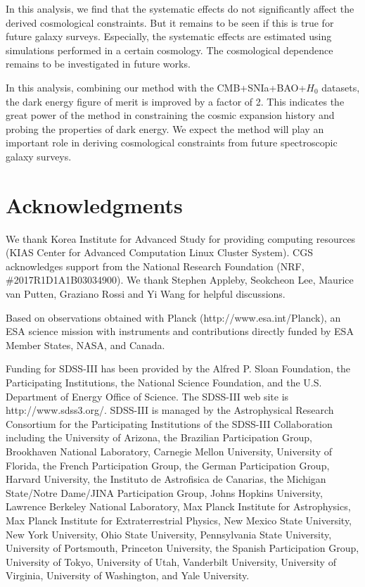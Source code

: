 \documentclass[iop]{emulateapj}
\begin{document}
In this analysis, we find that the systematic effects do not significantly affect the derived cosmological constraints.
But it remains to be seen if this is true for future galaxy surveys.
Especially, the systematic effects are estimated using simulations performed in a certain cosmology.
The cosmological dependence remains to be investigated in future works.


In this analysis, combining our method with the CMB+SNIa+BAO+$H_0$ datasets,
the dark energy figure of merit is improved by a factor of 2.
This indicates the great power of the method in constraining the cosmic expansion history and probing the properties of dark energy.
We expect the method will play an important role in deriving cosmological constraints from future spectroscopic galaxy surveys.



\section*{Acknowledgments}

We thank Korea Institute for Advanced Study for providing computing resources (KIAS Center for Advanced Computation Linux Cluster System).
CGS acknowledges support from the National Research Foundation (NRF,  \#2017R1D1A1B03034900). 
We thank Stephen Appleby, Seokcheon Lee, Maurice van Putten, Graziano Rossi and Yi Wang for helpful discussions.

Based on observations obtained with Planck (http://www.esa.int/Planck), 
an ESA science mission with instruments and contributions directly funded by 
ESA Member States, NASA, and Canada.


Funding for SDSS-III has been provided by the Alfred P. Sloan Foundation, the Participating Institutions, the
National Science Foundation, and the U.S. Department of Energy Office of Science. 
The SDSS-III web site is http://www.sdss3.org/. 
SDSS-III is managed by the Astrophysical Research Consortium for the Participating Institutions
of the SDSS-III Collaboration including the University of Arizona, the Brazilian Participation Group, Brookhaven
National Laboratory, Carnegie Mellon University, University of Florida, the French Participation Group, 
the German Participation Group, Harvard University, the Instituto de Astrofisica de Canarias, the Michigan State/Notre
Dame/JINA Participation Group, Johns Hopkins University, Lawrence Berkeley National Laboratory, Max Planck
Institute for Astrophysics, Max Planck Institute for Extraterrestrial Physics, New Mexico State University, New
York University, Ohio State University, Pennsylvania State
University, University of Portsmouth, Princeton University,
the Spanish Participation Group, University of Tokyo, University of Utah, Vanderbilt University, University of Virginia, 
University of Washington, and Yale University.
\end{document}
